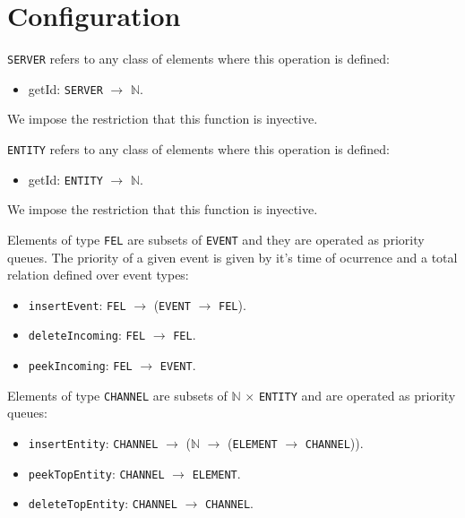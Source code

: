 \documentclass{article}
\begin{document}
\section*{Configuration}

\verb|SERVER| refers to any class of elements where this operation is defined:
\begin{itemize}
	\item getId: \verb|SERVER| $\to$ $\mathbb{N}$. 
\end{itemize}
We impose the restriction that this function is inyective.

\verb|ENTITY| refers to any class of elements where this operation is defined:
\begin{itemize}
	\item getId: \verb|ENTITY| $\to$ $\mathbb{N}$. 
	
\end{itemize}
We impose the restriction that this function is inyective.

Elements of type \verb|FEL| are subsets of \verb|EVENT| and they are operated as priority queues. The priority of a given event is given by it's time of ocurrence and a total relation defined over event types: 
\begin{itemize}
	\item \verb|insertEvent|: \verb|FEL| $\to$ (\verb|EVENT| $\to$ \verb|FEL|). 
	\item \verb|deleteIncoming|: \verb|FEL| $\to$ \verb|FEL|. 
	\item \verb|peekIncoming|: \verb|FEL| $\to$ \verb|EVENT|.

\end{itemize}

Elements of type \verb|CHANNEL| are subsets of $\mathbb{N}$ $\times$ \verb|ENTITY| and are operated as priority queues: \begin{itemize} \item \verb|insertEntity|: \verb|CHANNEL| $\to$ ($\mathbb{N}$ $\to$ (\verb|ELEMENT| $\to$ \verb|CHANNEL|)).  \item \verb|peekTopEntity|: \verb|CHANNEL| $\to$ \verb|ELEMENT|.  \item \verb|deleteTopEntity|: \verb|CHANNEL| $\to$ \verb|CHANNEL|.  \end{itemize}
\end{document}
